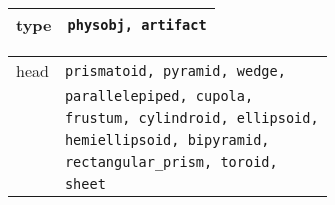 \documentclass[10pt, a4paper]{article}
\begin{document}

\begin{table}[H]
\def\baselinestretch{1}
{\small
\begin{tabular}{|l|l|}
\hline
{\sc type} & {\tt physobj, artifact} \\
\hline
\end{tabular}
} 
\def\baselinestretch{1.9}
\end{table}

\begin{table}[H]
\def\baselinestretch{1}
{\small
\begin{tabular}{|l|l|}
\hline
{\sc head} & {\tt prismatoid, pyramid, wedge,} \\
& {\tt parallelepiped, cupola,} \\
& {\tt frustum, cylindroid, ellipsoid,} \\
& {\tt hemiellipsoid, bipyramid,} \\
& {\tt rectangular\_prism, toroid,} \\
& {\tt sheet} \\
\hline
\end{tabular}
} 
\def\baselinestretch{1.9}
\end{table}
\end{document}

